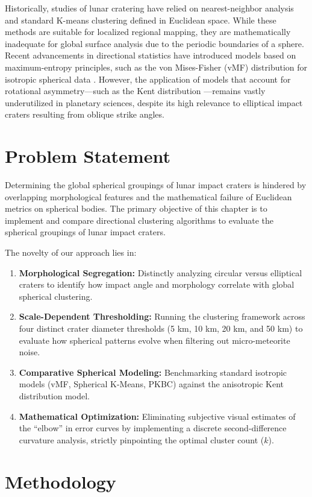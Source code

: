 \documentclass[12pt,a4paper]{report}
\begin{document}
Historically, studies of lunar cratering have relied on nearest-neighbor analysis and standard K-means clustering defined in Euclidean space. While these methods are suitable for localized regional mapping, they are mathematically inadequate for global surface analysis due to the periodic boundaries of a sphere. Recent advancements in directional statistics have introduced models based on maximum-entropy principles, such as the von Mises-Fisher (vMF) distribution for isotropic spherical data \cite{hornik2014}. However, the application of models that account for rotational asymmetry—such as the Kent distribution \cite{kent1982}—remains vastly underutilized in planetary sciences, despite its high relevance to elliptical impact craters resulting from oblique strike angles.

\section{Problem Statement}
Determining the global spherical groupings of lunar impact craters is hindered by overlapping morphological features and the mathematical failure of Euclidean metrics on spherical bodies. The primary objective of this chapter is to implement and compare directional clustering algorithms to evaluate the spherical groupings of lunar impact craters. 

The novelty of our approach lies in:
\begin{enumerate}
    \item \textbf{Morphological Segregation:} Distinctly analyzing circular versus elliptical craters to identify how impact angle and morphology correlate with global spherical clustering.
    \item \textbf{Scale-Dependent Thresholding:} Running the clustering framework across four distinct crater diameter thresholds (5 km, 10 km, 20 km, and 50 km) to evaluate how spherical patterns evolve when filtering out micro-meteorite noise.
    \item \textbf{Comparative Spherical Modeling:} Benchmarking standard isotropic models (vMF, Spherical K-Means, PKBC) against the anisotropic Kent distribution model.
    \item \textbf{Mathematical Optimization:} Eliminating subjective visual estimates of the ``elbow'' in error curves by implementing a discrete second-difference curvature analysis, strictly pinpointing the optimal cluster count ($k$).
\end{enumerate}

\section{Methodology}
\end{document}
